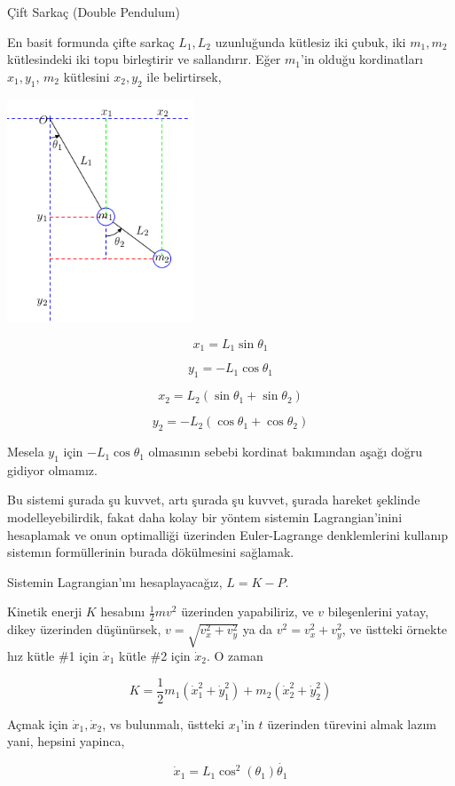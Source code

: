 \documentclass[12pt,fleqn]{article}\usepackage{../../common}
\begin{document}
Çift Sarkaç (Double Pendulum)

En basit formunda çifte sarkaç $L_1,L_2$ uzunluğunda kütlesiz iki çubuk, iki
$m_1,m_2$ kütlesindeki iki topu birleştirir ve sallandırır. Eğer $m_1$'in
olduğu kordinatları $x_1,y_1$, $m_2$ kütlesini $x_2,y_2$ ile belirtirsek,

\includegraphics[width=15em]{phy_dblpend_01.png}

$$
x_1 = L_1 \sin\theta_1
$$

$$
y_1 = - L_1 \cos\theta_1
$$

$$
x_2 = L_2  (\sin\theta_1 +  \sin\theta_2) 
$$

$$
y_2 = -L_2  (\cos\theta_1 + \cos \theta_2)
$$

Mesela $y_1$ için $- L_1 \cos\theta_1$ olmasının sebebi kordinat
bakımından aşağı doğru gidiyor olmamız. 

Bu sistemi şurada şu kuvvet, artı şurada şu kuvvet, şurada hareket şeklinde
modelleyebilirdik, fakat daha kolay bir yöntem sistemin Lagrangian'inini
hesaplamak ve onun optimalliği üzerinden Euler-Lagrange denklemlerini
kullanıp sistemın formüllerinin burada dökülmesini sağlamak. 

Sistemin Lagrangian'ını hesaplayacağız, $L = K - P$. 

Kinetik enerji $K$ hesabını $\frac{1}{2} m v^2$ üzerinden yapabiliriz, ve
$v$ bileşenlerini yatay, dikey üzerinden düşünürsek,
$v = \sqrt{v_x^2 + v_y^2}$ ya da $v^2 = v_x^2 + v_y^2$, ve üstteki örnekte
hız kütle \#1 için $\dot{x}_1$ kütle \#2 için $\dot{x}_2$. O zaman

$$
K = \frac{1}{2} m_1 ( \dot{x}_1 ^2 + \dot{y}_1 ^2 )  + m_2 ( \dot{x}_2 ^2 + \dot{y}_2 ^2 ) 
$$

Açmak için $\dot{x}_1, \dot{x}_2$, vs bulunmalı, üstteki $x_1$'in $t$
üzerinden türevini almak lazım yani, hepsini yapinca,

$$
\dot{x}_1 = L_1 \cos^2(\theta_1)\dot{\theta_1}
$$
\end{document}
